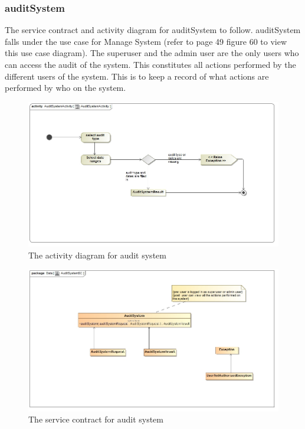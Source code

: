 \documentclass[a4paper,12pt]{report}
\begin{document}
\subsubsection{auditSystem}
The service contract and activity diagram for auditSystem to follow. auditSystem falls under the use case for Manage System (refer to page 49 figure 60 to view this use case diagram). The superuser and the admin user are the only users who can access the audit of the system.  This constitutes all actions performed by the different users of the system. This is to keep a record of what actions are performed by who on the system.
\begin{figure}[H]
  \centering
    \includegraphics[width=1.0\textwidth]{../images/AuditSystemActivity.jpg}
    \caption{The activity diagram for audit system} 
\end{figure}

\begin{figure}[H]
	\centering
	\includegraphics[width=1.0\textwidth]{../images/AuditSystemSC.jpg}
	\caption{The service contract for audit system}
\end{figure}
\end{document}
